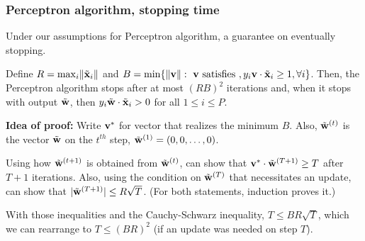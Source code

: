 \documentclass{beamer}
\theoremstyle{example}
\begin{document}
\begin{frame}
    \frametitle{Perceptron algorithm, stopping time}
    Under our assumptions for Perceptron algorithm, a guarantee on eventually stopping.

    \begin{theorem}Define $R = \max_i\lVert\tilde{\bf x}_i\rVert$ and $B = \min\{\lVert{\bf v}\rVert :\  {\bf v} \text{ satisfies }, y_i{\bf v}\cdot \tilde{\bf x}_i \ge 1, \forall i\}$. Then, the Perceptron algorithm stops after at most $(RB)^2$ iterations and, when it stops with output $\tilde{\bf w}$, then $y_i\tilde{\bf w}\cdot \tilde{\bf x}_i > 0$ for all $1\le i\le P$.
    \end{theorem}

    \pause 
    \textbf{Idea of proof:} Write ${\bf v}^*$ for vector that realizes the minimum $B$. Also, $\tilde{\bf w}^{(t)}$ is the vector $\tilde{\bf w}$ on the $t^{th}$ step, $\tilde{\bf w}^{(1)} = (0,0,\ldots,0)$.

    \pause
    Using how $\tilde{\bf w}^{(t+1)}$ is obtained from $\tilde{\bf w}^{(t)}$, can show that ${\bf v}^*\cdot \tilde{\bf w}^{(T+1)} \ge T$ after $T+1$ iterations. Also, using the condition on $\tilde{\bf w}^{(T)}$ that necessitates an update, can show that $|\tilde{\bf w}^{(T+1)}| \le R\sqrt{T}$. (For both statements, induction proves it.) 

    \pause
    With those inequalities and the Cauchy-Schwarz inequality, $T \le BR\sqrt{T}$, which we can rearrange to $T\le (BR)^2$ (if an update was needed on step $T$).
\end{frame}
\end{document}
